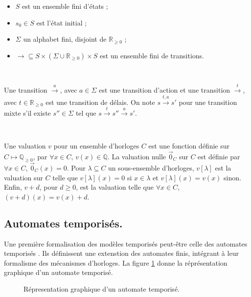 \documentclass{article}
\begin{document}
      \begin{itemize}
        \item $S$ est un ensemble fini d'états ;
        \item $s_0\in S$ est l'état initial ;
        \item $\Sigma$ un alphabet fini, disjoint de $\mathbb{R}_{\geq 0}$ ;
        \item $\rightarrow \subseteq S \times (\Sigma \cup \mathbb{R}_{\geq 0})
          \times S$ est un ensemble fini de transitions.
      \end{itemize}
      
      ~
      
      Une transition $\xrightarrow{a}$, avec $a \in \Sigma$ est une transition
      d'action et une transition $\xrightarrow{t}$, avec $t \in \mathbb{R}_{\geq
        0}$ est une transition de délais. On note $s\xrightarrow{t,a}s'$ pour
      une transition mixte s'il existe $s'' \in \Sigma$ tel que
      $s\xrightarrow{t}s''\xrightarrow{a}s'$.
      
      ~
      
      Une valuation $v$ pour un ensemble d'horloges $C$ est une fonction définie
      sur $C \mapsto \mathbb{Q}_{\geq 0}$, par $\forall x \in C$, $v(x) \in
      \mathbb{Q}$. La valuation nulle $\vec{0}_C$ sur $C$ est définie par
      $\forall x \in C$, $\vec{0}_C(x) = 0$. Pour $\lambda \subseteq C$ un
      sous-ensemble d'horloges, $v[\lambda]$ est la valuation sur $C$ telle que
      $v[\lambda](x) = 0$ si $x \in \lambda$ et $v[\lambda](x) = v(x)$ sinon.
      Enfin, $v + d$, pour $d \geq 0$, est la valuation telle que $\forall x\in
      C$, $(v + d)(x) = v(x) + d$.
            
    \subsection{Automates temporisés.}
    
    
      Une première formalisation des modèles temporisés peut-être celle des
      automates temporisés \cite{alur94}. Ils définissent une extenstion des
      automates finis, intégrant à leur formalisme des mécanismes d'horloges. La
      figure \ref{fig:automate-tempo} donne la réprésentation graphique d'un
      automate temporisé.

      \begin{figure}
        \centering \small
        \caption{Répresentation graphique d'un automate temporisé.}
        \label{fig:automate-tempo}
      \end{figure}
\end{document}
